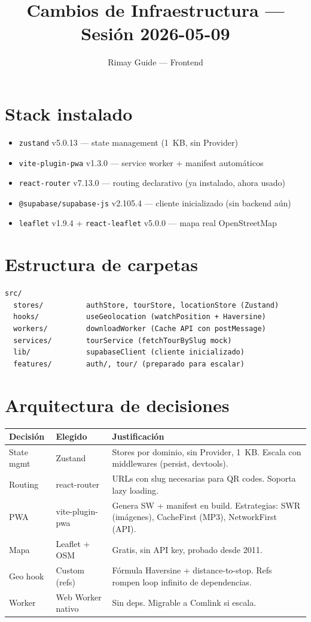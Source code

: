 \documentclass[11pt,a4paper]{article}
\title{Cambios de Infraestructura — Sesión 2026-05-09}
\author{Rimay Guide — Frontend}
\date{}
\begin{document}
\maketitle

\section{Stack instalado}
\begin{itemize}[nosep]
  \item \texttt{zustand} v5.0.13 — state management (1~KB, sin Provider)
  \item \texttt{vite-plugin-pwa} v1.3.0 — service worker + manifest automáticos
  \item \texttt{react-router} v7.13.0 — routing declarativo (ya instalado, ahora usado)
  \item \texttt{@supabase/supabase-js} v2.105.4 — cliente inicializado (sin backend aún)
  \item \texttt{leaflet} v1.9.4 + \texttt{react-leaflet} v5.0.0 — mapa real OpenStreetMap
\end{itemize}

\section{Estructura de carpetas}
\begin{verbatim}
src/
  stores/          authStore, tourStore, locationStore (Zustand)
  hooks/           useGeolocation (watchPosition + Haversine)
  workers/         downloadWorker (Cache API con postMessage)
  services/        tourService (fetchTourBySlug mock)
  lib/             supabaseClient (cliente inicializado)
  features/        auth/, tour/ (preparado para escalar)
\end{verbatim}

\section{Arquitectura de decisiones}

\begin{tabularx}{\textwidth}{l|X|X}
  \textbf{Decisión} & \textbf{Elegido} & \textbf{Justificación} \\
  \hline
  State mgmt   & Zustand     & Stores por dominio, sin Provider, 1~KB. Escala con middlewares (persist, devtools). \\
  Routing      & react-router & URLs con slug necesarias para QR codes. Soporta lazy loading. \\
  PWA          & vite-plugin-pwa & Genera SW + manifest en build. Estrategias: SWR (imágenes), CacheFirst (MP3), NetworkFirst (API). \\
  Mapa         & Leaflet + OSM & Gratis, sin API key, probado desde 2011. \\
  Geo hook     & Custom (refs) & Fórmula Haversine + distance-to-stop. Refs rompen loop infinito de dependencias. \\
  Worker       & Web Worker nativo & Sin deps. Migrable a Comlink si escala. \\
\end{tabularx}
\end{document}
